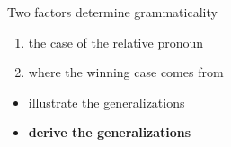 \documentclass[xcolor=dvipsnames,10pt]{beamer}
\begin{document}
\begin{frame}[t]{Two factors determine grammaticality}

\pause

\begin{enumerate}
  \item {the case of the relative pronoun}
  \item {where the winning case comes from}
\end{enumerate}

  \vspace{1em}

  {
  \begin{itemize}
    \item {illustrate the generalizations}
    \item \textbf<3>{derive the generalizations}
  \end{itemize}
  }

\end{frame}
\end{document}
